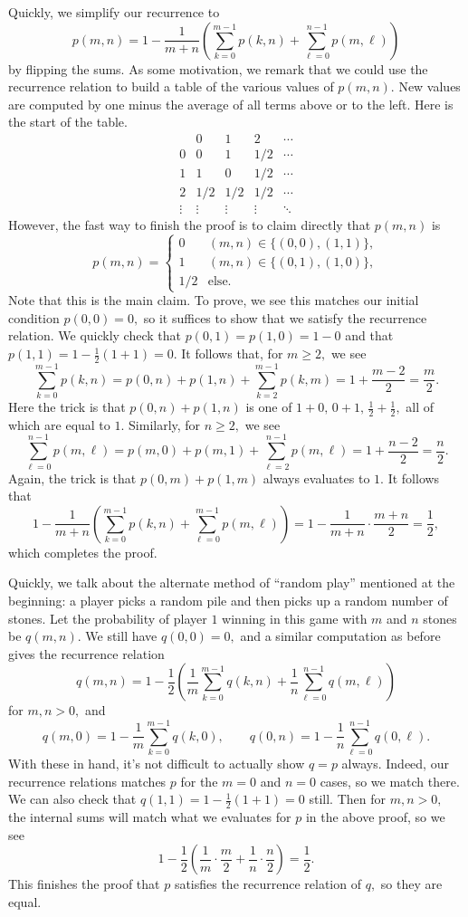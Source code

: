 Quickly, we simplify our recurrence to
\[p(m,n)=1-\frac1{m+n}\left(\sum_{k=0}^{m-1}p(k,n)+\sum_{\ell=0}^{n-1}p(m,\ell)\right)\]
by flipping the sums. As some motivation, we remark that we could use the recurrence relation to build a table of the various values of $p(m,n).$ New values are computed by one minus the average of all terms above or to the left. Here is the start of the table.
\[\begin{array}{r|c|c|c|c}
           & 0      & 1       & 2     & \cdots \\\hline
    0      & 0      & 1      & 1/2    & \cdots \\\hline
    1      & 1      & 0      & 1/2    & \cdots \\\hline
    2      & 1/2    & 1/2    & 1/2    & \cdots \\\hline
    \vdots & \vdots & \vdots & \vdots & \ddots
\end{array}\]
However, the fast way to finish the proof is to claim directly that $p(m,n)$ is
\[p(m,n)=\begin{cases}
    0 & (m,n)\in\{(0,0),(1,1)\}, \\
    1 & (m,n)\in\{(0,1),(1,0)\}, \\
    1/2 & \text{else}.
\end{cases}\]
Note that this is the main claim. To prove, we see this matches our initial condition $p(0,0)=0,$ so it suffices to show that we satisfy the recurrence relation. We quickly check that $p(0,1)=p(1,0)=1-0$ and that $p(1,1)=1-\frac12(1+1)=0.$ It follows that, for $m\ge2,$ we see
\[\sum_{k=0}^{m-1}p(k,n)=p(0,n)+p(1,n)+\sum_{k=2}^{m-1}p(k,m)=1+\frac{m-2}2=\frac m2.\]
Here the trick is that $p(0,n)+p(1,n)$ is one of $1+0,\,0+1,\,\frac12+\frac12,$ all of which are equal to $1.$ Similarly, for $n\ge2,$ we see
\[\sum_{\ell=0}^{n-1}p(m,\ell)=p(m,0)+p(m,1)+\sum_{\ell=2}^{n-1}p(m,\ell)=1+\frac{n-2}2=\frac n2.\]
Again, the trick is that $p(0,m)+p(1,m)$ always evaluates to $1.$ It follows that
\[1-\frac1{m+n}\left(\sum_{k=0}^{m-1}p(k,n)+\sum_{\ell=0}^{m-1}p(m,\ell)\right)=1-\frac1{m+n}\cdot\frac{m+n}2=\frac12,\]
which completes the proof.

Quickly, we talk about the alternate method of ``random play'' mentioned at the beginning: a player picks a random pile and then picks up a random number of stones. Let the probability of player $1$ winning in this game with $m$ and $n$ stones be $q(m,n).$ We still have $q(0,0)=0,$ and a similar computation as before gives the recurrence relation
\[q(m,n)=1-\frac12\left(\frac1m\sum_{k=0}^{m-1}q(k,n)+\frac1n\sum_{\ell=0}^{n-1}q(m,\ell)\right)\]
for $m,n>0,$ and
\[q(m,0)=1-\frac1m\sum_{k=0}^{m-1}q(k,0),\qquad q(0,n)=1-\frac1n\sum_{\ell=0}^{n-1}q(0,\ell).\]
With these in hand, it's not difficult to actually show $q=p$ always. Indeed, our recurrence relations matches $p$ for the $m=0$ and $n=0$ cases, so we match there. We can also check that $q(1,1)=1-\frac12(1+1)=0$ still. Then for $m,n>0,$ the internal sums will match what we evaluates for $p$ in the above proof, so we see
\[1-\frac12\left(\frac1m\cdot\frac m2+\frac1n\cdot\frac n2\right)=\frac12.\]
This finishes the proof that $p$ satisfies the recurrence relation of $q,$ so they are equal.

